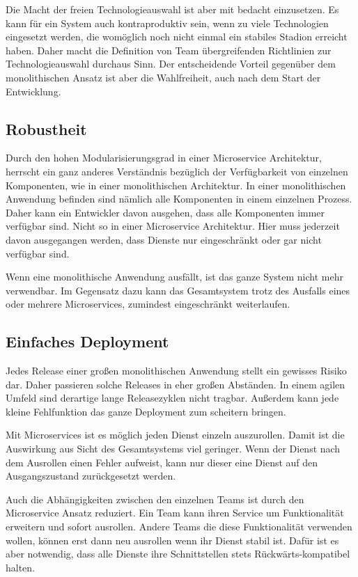 Die Macht der freien Technologieauswahl ist aber mit bedacht einzusetzen. Es kann für ein System auch kontraproduktiv sein, wenn zu viele Technologien eingesetzt werden, die womöglich noch nicht einmal ein stabiles Stadion erreicht haben. Daher macht die Definition von Team übergreifenden Richtlinien zur Technologieauswahl durchaus Sinn. Der entscheidende Vorteil gegenüber dem monolithischen Ansatz ist aber die Wahlfreiheit, auch nach dem Start der Entwicklung.

\subsection{Robustheit}

Durch den hohen Modularisierungsgrad in einer Microservice Architektur, herrscht ein ganz anderes Verständnis bezüglich der Verfügbarkeit von einzelnen Komponenten, wie in einer monolithischen Architektur. In einer monolithischen Anwendung befinden sind nämlich alle Komponenten in einem einzelnen Prozess. Daher kann ein Entwickler davon ausgehen, dass alle Komponenten immer verfügbar sind. Nicht so in einer Microservice Architektur. Hier muss jederzeit davon ausgegangen werden, dass Dienste nur eingeschränkt oder gar nicht verfügbar sind.

Wenn eine monolithische Anwendung ausfällt, ist das ganze System nicht mehr verwendbar. Im Gegensatz dazu kann das Gesamtsystem trotz des Ausfalls eines oder mehrere Microservices, zumindest eingeschränkt weiterlaufen.

\subsection{Einfaches Deployment}

Jedes Release einer großen monolithischen Anwendung stellt ein gewisses Risiko dar. Daher passieren solche Releases in eher großen Abständen. In einem agilen Umfeld sind derartige lange Releasezyklen nicht tragbar. Außerdem kann jede kleine Fehlfunktion das ganze Deployment zum scheitern bringen.

Mit Microservices ist es möglich jeden Dienst einzeln auszurollen. Damit ist die Auswirkung aus Sicht des Gesamtsystems viel geringer. Wenn der Dienst nach dem Ausrollen einen Fehler aufweist, kann nur dieser eine Dienst auf den Ausgangszustand zurückgesetzt werden.

Auch die Abhängigkeiten zwischen den einzelnen Teams ist durch den Microservice Ansatz reduziert. Ein Team kann ihren Service um Funktionalität erweitern und sofort ausrollen. Andere Teams die diese Funktionalität verwenden wollen, können erst dann neu ausrollen wenn ihr Dienst stabil ist. Dafür ist es aber notwendig, dass alle Dienste ihre Schnittstellen stets Rückwärts-kompatibel halten.


